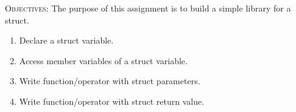 \textsc{Objectives:}
The purpose of this assignment is to build a simple library for a struct.
\begin{enumerate}[nosep]
\item Declare a struct variable.
\item Access member variables of a struct variable.
\item Write function/operator with struct parameters.
\item Write function/operator with struct return value.
\end{enumerate}
